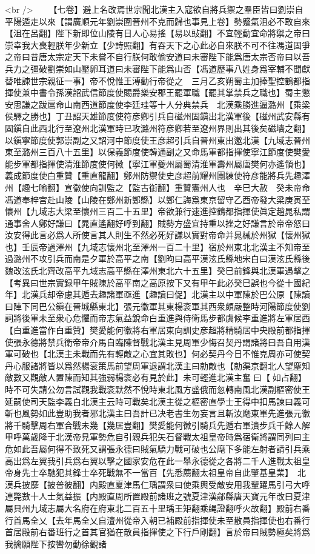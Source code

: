 <br />
　　【七卷】避上名改焉世宗聞北漢主入寇欲自將兵禦之羣臣皆曰劉崇自平陽遁走以來【謂廣順元年劉崇圍晉州不克而歸也事見上卷】勢蹙氣沮必不敢自來【沮在呂翻】陛下新即位山陵有日人心易搖【易以䜴翻】不宜輕動宜命將禦之帝曰崇幸我大喪輕朕年少新立【少詩照翻】有吞天下之心此必自來朕不可不往馮道固爭之帝曰昔唐太宗定天下未嘗不自行朕何敢偷安道曰未審陛下能爲唐太宗否帝曰以吾兵力之彊破劉崇如山壓卵耳道曰未審陛下能爲山否【馮道歷事八姓身爲宰輔不聞獻替唯諫世宗親征一事】帝不悅惟王溥勸行帝從之　三月乙亥朔蜀主加捧聖控鶴都指揮使兼中書令孫漢韶武信節度使賜爵樂安郡王罷軍職【罷其掌禁兵之職也】蜀主懲安思謙之跋扈命山南西道節度使李廷珪等十人分典禁兵　北漢乘勝進逼潞州【乘梁侯驛之勝也】丁丑詔天雄節度使符彦卿引兵自磁州固鎭出北漢軍後【磁州武安縣有固鎭自此西北行至遼州北漢軍時已攻潞州符彦卿若至遼州界則出其後矣磁墻之翻】以鎭寧節度使郭崇副之又詔河中節度使王彦超引兵自晉州東出邀北漢【九域志晉州東至潞州三百八十五里】以保義節度使韓通副之又命馬軍都指揮使寧江節度使樊愛能步軍都指揮使清淮節度使何徽【寧江軍夔州屬蜀清淮軍壽州屬唐樊何亦遙領也】義成節度使白重贊【重直龍翻】鄭州防禦使史彦超前耀州團練使符彦能將兵先趣澤州【趣七喻翻】宣徽使向訓監之【監古衘翻】重贊憲州人也　辛巳大赦　癸未帝命馮道奉梓宫赴山陵【山陵在鄭州新鄭縣】以鄭仁誨爲東京留守乙酉帝發大梁庚寅至懷州【九域志大梁至懷州三百二十五里】帝欲兼行速進控鶴都指揮使眞定趙晁私謂通事舍人鄭好謙曰【晁直遙翻好呼到翻】賊勢方盛宜持重以挫之好謙言於帝帝怒曰汝安得此言必爲人所使言其人則生不然必死好謙以實對帝命并晁械於州獄【懷州獄也】壬辰帝過澤州【九域志懷州北至澤州一百二十里】宿於州東北北漢主不知帝至過潞州不攻引兵而南是夕軍於高平之南【劉昫曰高平漢泫氏縣地宋白曰漢泫氏縣後魏改泫氏北齊改高平九域志高平縣在澤州東北六十五里】癸巳前鋒與北漢軍遇擊之　【考異曰世宗實録甲午賊陳於高平南之高原按下又有甲午此必癸巳誤也今從十國紀年】北漢兵却帝慮其遁去趣諸軍亟進【趣讀曰促】北漢主以中軍陳於巴公原【陳讀曰陣下同巴公鎭在晉城縣東北】張元徽軍其東楊衮軍其西衆頗嚴整時河陽節度使劉詞將後軍未至衆心危懼而帝志氣益銳命白重進與侍衛馬步都虞候李重進將左軍居西【白重進當作白重贊】樊愛能何徽將右軍居東向訓史彦超將精騎居中央殿前都指揮使張永德將禁兵衛帝帝介馬自臨陳督戰北漢主見周軍少悔召契丹謂諸將曰吾自用漢軍可破也【北漢主未戰而先有輕敵之心宜其敗也】何必契丹今日不惟克周亦可使契丹心服諸將皆以爲然楊衮策馬前望周軍退謂北漢主曰勍敵也【勍渠京翻北人望塵知敵數又觀敵人置陳而知其強弱楊衮必有見於此】未可輕進北漢主奮曰【如占翻】時不可失請公勿言試觀我戰衮默然不悅時東北風方盛俄而忽轉南風北漢副樞密使王延嗣使司天監李義白北漢主云時可戰矣北漢主從之樞密直學士王得中扣馬諫曰義可斬也風勢如此豈助我者邪北漢主曰吾計已决老書生勿妄言且斬汝麾東軍先進張元徽將千騎擊周右軍合戰未幾【幾居豈翻】樊愛能何徽引騎兵先遁右軍潰步兵千餘人解甲呼萬歲降于北漢帝見軍勢危自引親兵犯矢石督戰太祖皇帝時爲宿衛將謂同列曰主危如此吾屬何得不致死又謂張永德曰賊氣驕力戰可破也公麾下多能左射者請引兵乘高出爲左翼我引兵爲右翼以擊之國家安危在此一舉永德從之各將二千人進戰太祖皇帝身先士卒馳犯其鋒士卒死戰無不一當百【先悉薦翻太祖皇帝自此肇基皇業】　北漢兵披靡【披普彼翻】内殿直夏津馬仁瑀謂衆曰使乘輿受敵安用我輩躍馬引弓大呼連斃數十人士氣益振【内殿直周所置殿前諸班之號夏津漢鄃縣唐天寶元年改曰夏津屬貝州九域志屬大名府在府東北二百五十里瑀王矩翻乘䋲證翻呼火故翻】殿前右番行首馬全乂【去年馬全乂自澶州從帝入朝已補殿前指揮使未至散員指揮使也右番行首居殿前右番班行之首其官猶在散員指揮使之下行戶剛翻】言於帝曰賊勢極矣將爲我擒願陛下按轡勿動徐觀諸